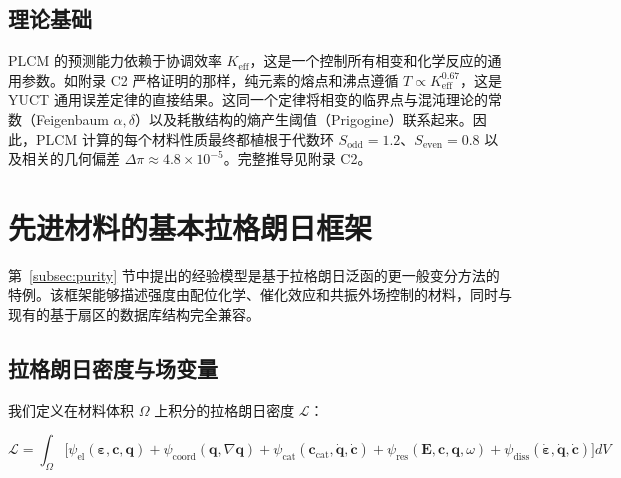 \documentclass[12pt,a4paper]{article}
\begin{document}
	
	\subsection{理论基础}
	
	PLCM 的预测能力依赖于协调效率 $K_{\mathrm{eff}}$，这是一个控制所有相变和化学反应的通用参数。如附录 C2 严格证明的那样，纯元素的熔点和沸点遵循 $T \propto K_{\mathrm{eff}}^{0.67}$，这是 YUCT 通用误差定律的直接结果。这同一个定律将相变的临界点与混沌理论的常数（Feigenbaum $\alpha,\delta$）以及耗散结构的熵产生阈值（Prigogine）联系起来。因此，PLCM 计算的每个材料性质最终都植根于代数环 $S_{\mathrm{odd}}=1.2$、$S_{\mathrm{even}}=0.8$ 以及相关的几何偏差 $\Delta\pi \approx 4.8\times10^{-5}$。完整推导见附录 C2。
	
	\section{先进材料的基本拉格朗日框架}
	\label{sec:lagrangian}
	
	第~\ref{subsec:purity} 节中提出的经验模型是基于拉格朗日泛函的更一般变分方法的特例。该框架能够描述强度由配位化学、催化效应和共振外场控制的材料，同时与现有的基于扇区的数据库结构完全兼容。
	
	\subsection{拉格朗日密度与场变量}
	\label{subsec:lagrangian-density}
	
	我们定义在材料体积 \(\Omega\) 上积分的拉格朗日密度 \(\mathcal{L}\)：
	
	\[
	\mathcal{L} = \int_{\Omega} \Big[ 
	\psi_{\mathrm{el}}(\boldsymbol{\varepsilon}, \mathbf{c}, \mathbf{q}) 
	+ \psi_{\mathrm{coord}}(\mathbf{q}, \nabla\mathbf{q}) 
	+ \psi_{\mathrm{cat}}(\mathbf{c}_{\mathrm{cat}}, \dot{\mathbf{q}}, \dot{\mathbf{c}}) 
	+ \psi_{\mathrm{res}}(\mathbf{E}, \mathbf{c}, \mathbf{q}, \omega) 
	+ \psi_{\mathrm{diss}}(\dot{\boldsymbol{\varepsilon}}, \dot{\mathbf{q}}, \dot{\mathbf{c}})
	\Big] dV
	\]
	
\end{document}
